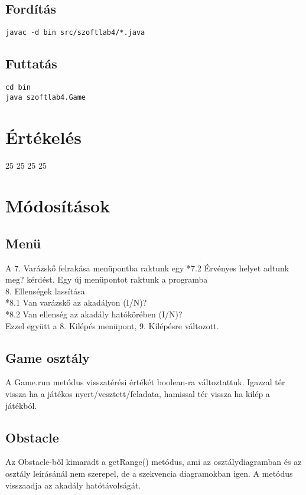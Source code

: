 \subsection{Fordítás}

\lstset{escapeinside=`', xleftmargin=10pt, frame=single, basicstyle=\ttfamily\footnotesize, language=sh}
\begin{lstlisting}
javac -d bin src/szoftlab4/*.java
\end{lstlisting}

\subsection{Futtatás}

\lstset{escapeinside=`', xleftmargin=10pt, frame=single, basicstyle=\ttfamily\footnotesize, language=sh}
\begin{lstlisting}
cd bin
java szoftlab4.Game
\end{lstlisting}

\section{Értékelés}

\begin{ertekeles}
{25}        %
{25}
{25}
{25}
\end{ertekeles}

\section{Módosítások}
\subsection{Menü}
A 7. Varázskő felrakása menüpontba raktunk egy *7.2 Érvényes helyet adtunk meg? kérdést.
Egy új menüpontot raktunk a programba \\
8. Ellenségek lassítása \\
*8.1 Van varázskő az akadályon (I/N)? \\
*8.2 Van ellenség az akadály hatókörében (I/N)? \\
Ezzel együtt a 8. Kilépés menüpont, 9. Kilépésre változott. \\

\subsection{Game osztály}
A Game.run metódus visszatérési értékét boolean-ra változtattuk. Igazzal tér vissza ha a játékos nyert/vesztett/feladata, hamissal tér vissza ha kilép a játékból.

\subsection{Obstacle}
Az Obstacle-ből kimaradt a getRange() metódus, ami az osztálydiagramban és az osztály leírásánál nem szerepel, de a szekvencia diagramokban igen. A metódus visszaadja az akadály hatótávolságát.
